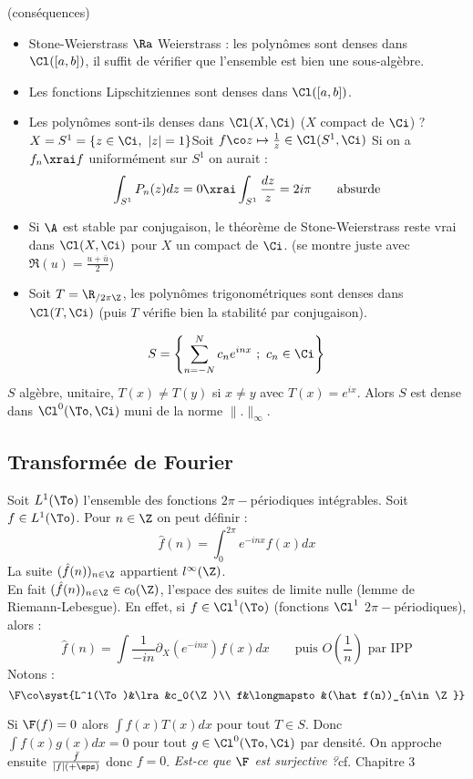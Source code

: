\rmks (conséquences)
\begin{itemize}
  \item Stone-Weierstrass $\Ra$ Weierstrass : les polynômes sont denses dans $\Cl([a,b])$, il suffit de vérifier que l'ensemble est bien une sous-algèbre.
  \item Les fonctions Lipschitziennes sont denses dans $\Cl([a,b])$.
  \item Les polynômes sont-ils denses dans $\Cl(X,\Ci)$ ($X$ compact de $\Ci$) ?
    \\ $X=S^1=\{z\in\Ci,\ |z|=1\}$\quad\quad Soit $f\co z\mapsto \frac 1 z\in\Cl(S^1,\Ci)$
    \dl Si on a $f_n\xrai f$ uniformément sur $S^1$ on aurait :
    $$\int_{S^1}P_n(z)dz=0\xrai\int_{S^1}\frac{dz}{z}=2i\pi\quad\quad\text{absurde}$$
  \item Si $\A$ est stable par conjugaison, le théorème de Stone-Weierstrass reste vrai dans $\Cl(X,\Ci)$ pour $X$ un compact de $\Ci$. (se montre juste avec $\Re(u)=\frac{u+\bar u}{2}$)
  \item Soit $T=\R_{/2\pi\Z}$, les polynômes trigonométriques sont denses dans $\Cl(T,\Ci)$ (puis $T$ vérifie bien la stabilité par conjugaison).
\end{itemize}


\exe
$$S=\left\{\sum_{n=-N}^N c_ne^{inx}\ ;\ c_n\in\Ci\right\}$$
$S$ algèbre, unitaire, $T(x)\neq T(y)$ si $x\neq y$ avec $T(x)=e^{ix}$. Alors $S$ est dense dans $\Cl^0(\To,\Ci)$ muni de la norme $\|.\|_\infty$.

\subsection{Transformée de Fourier}
\dl Soit $L^1(\To)$ l'ensemble des fonctions $2\pi-$périodiques intégrables. Soit $f\in L^1(\To)$. Pour $n\in\Z$ on peut définir :
$$\hat f(n)=\int_0^{2\pi} e^{-inx}f(x)dx$$
La suite $(\hat f(n))_{n\in\Z}$ appartient $l^\infty(\Z)$. 
\\ En fait $(\hat f(n))_{n\in\Z}\in c_0(\Z)$, l'espace des suites de limite nulle (lemme de Riemann-Lebesgue). En effet, si $f\in\Cl^1(\To)$ (fonctions $\Cl^1$ $2\pi-$périodiques), alors :
$$\hat f(n)=\int\frac{1}{-in}\partial_X(e^{-inx})f(x)dx\quad\quad\text{puis }O\left(\frac 1 n\right)\text{ par IPP}$$
\dl Notons :
$$\F\co\syst{L^1(\To)&\lra&c_0(\Z)\\ f&\longmapsto&(\hat f(n))_{n\in\Z}}$$

\prvv
Si $\F(f)=0$ alors $\int f(x)T(x)dx$ pour tout $T\in S$. Donc $\int f(x)g(x)dx=0$ pour tout $g\in \Cl^0(\To,\Ci)$ par densité. On approche ensuite $\frac{\bar f}{|f|(+\eps)}$ donc $f=0$. 
\prvf
\dd\emph{Est-ce que $\F$ est surjective ?}\quad cf. Chapitre 3


